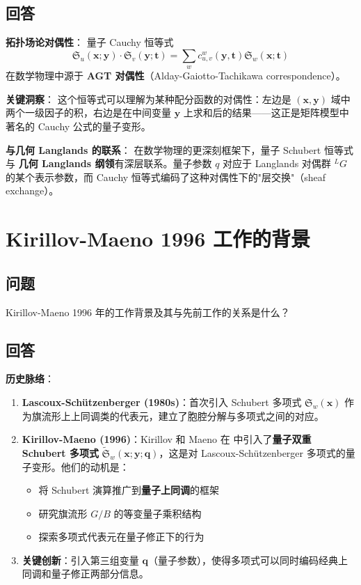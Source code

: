 \subsection{回答}
\textbf{拓扑场论对偶性}：
量子 Cauchy 恒等式
$$\mathfrak{S}_u(\mathbf{x}; \mathbf{y}) \cdot \mathfrak{S}_v(\mathbf{y}; \mathbf{t}) = \sum_w c^w_{u,v}(\mathbf{y}, \mathbf{t}) \mathfrak{S}_w(\mathbf{x}; \mathbf{t})$$
在数学物理中源于 \textbf{AGT 对偶性}（Alday-Gaiotto-Tachikawa correspondence）。

\textbf{关键洞察}：
这个恒等式可以理解为某种配分函数的对偶性：左边是 $(\mathbf{x}, \mathbf{y})$ 域中两个一级因子的积，右边是在中间变量 $\mathbf{y}$ 上求和后的结果——这正是矩阵模型中著名的 Cauchy 公式的量子变形。

\textbf{与几何 Langlands 的联系}：
在数学物理的更深刻框架下，量子 Schubert 恒等式与 \textbf{几何 Langlands 纲领}有深层联系。量子参数 $q$ 对应于 Langlands 对偶群 ${}^L G$ 的某个表示参数，而 Cauchy 恒等式编码了这种对偶性下的"层交换"（sheaf exchange）。

\section{Kirillov-Maeno 1996 工作的背景}\label{sec:KM1996-background}
\subsection{问题}
Kirillov-Maeno 1996 年的工作背景及其与先前工作的关系是什么？

\subsection{回答}
\textbf{历史脉络}：
\begin{enumerate}
\item \textbf{Lascoux-Schützenberger (1980s)}：首次引入 Schubert 多项式 $\mathfrak{S}_w(\mathbf{x})$ 作为旗流形上上同调类的代表元，建立了胞腔分解与多项式之间的对应。

\item \textbf{Kirillov-Maeno (1996)}：Kirillov 和 Maeno 在 \cite{KM} 中引入了\textbf{量子双重 Schubert 多项式} $\widetilde{\mathfrak{S}}_w(\mathbf{x}; \mathbf{y}; \mathbf{q})$，这是对 Lascoux-Schützenberger 多项式的量子变形。他们的动机是：
  \begin{itemize}
  \item 将 Schubert 演算推广到\textbf{量子上同调}的框架
  \item 研究旗流形 $G/B$ 的等变量子乘积结构
  \item 探索多项式代表元在量子修正下的行为
  \end{itemize}
  
\item \textbf{关键创新}：引入第三组变量 $\mathbf{q}$（量子参数），使得多项式可以同时编码经典上同调和量子修正两部分信息。
\end{enumerate}

